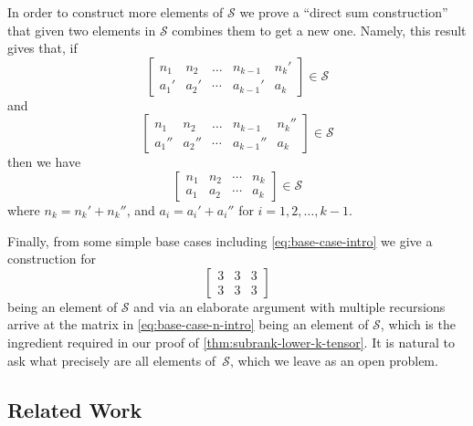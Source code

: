 \documentclass[10pt,a4paper]{article}
\theoremstyle{definition}
\theoremstyle{remark}
\begin{document}
In order to construct more elements of $\mathcal{S}$ we prove a ``direct sum construction'' that given two elements in $\mathcal{S}$ combines them to get a new one. Namely, this result gives that, if
\[
\begin{bmatrix} n_1 & n_2 & \dots & n_{k-1} & n_k'\\
a_1' & a_2' & \cdots & a_{k-1}' & a_k\end{bmatrix} \in \mathcal{S}
\]
and
\[
\begin{bmatrix} n_1 & n_2 & \dots & n_{k-1} & n_k''\\
a_1'' & a_2'' & \cdots & a_{k-1}'' & a_k\end{bmatrix} \in \mathcal{S}
\]
then we have 
\[
\begin{bmatrix} 
n_1 & n_2 & \cdots & n_k\\
a_1 & a_2  & \cdots & a_k
\end{bmatrix}\in \mathcal{S}
\]
where $n_k=n_k'+n_k''$, and $a_i=a_i'+a_i''$ for $i=1,2,\dots,k-1$.

Finally, from some simple base cases including \eqref{eq:base-case-intro} we give a construction for 
\[ 
\begin{bmatrix} 3 & 3 & 3\\3 & 3 & 3\end{bmatrix}
\] 
being an element of $\mathcal{S}$
and via an elaborate argument with multiple recursions arrive at the matrix in \eqref{eq:base-case-n-intro} being an element of $\mathcal{S}$, which is the ingredient required in our proof of \autoref{thm:subrank-lower-k-tensor}. It is natural to ask what precisely are all elements of~$\mathcal{S}$, which we leave as an open problem.


\subsection{Related Work}\label{subsec:related}
\end{document}
